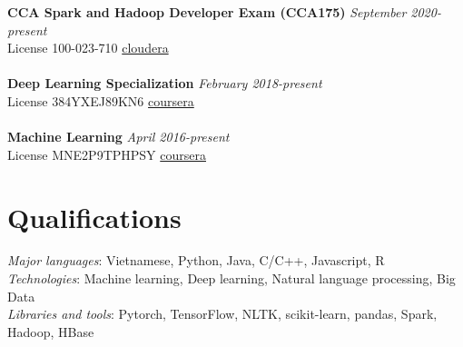 \documentclass[11pt,a4paper,roman]{article}
\begin{document}
\textbf{CCA Spark and Hadoop Developer Exam (CCA175)}
\hfill
\textit{September 2020-present} \\
License 100-023-710
\hfill
\href{http://certification.cloudera.com/verify/user}{cloudera}
\\\\
\textbf{Deep Learning Specialization}
\hfill
\textit{February 2018-present} \\
License 384YXEJ89KN6
\hfill
\href{https://www.coursera.org/account/accomplishments/verify/384YXEJ89KN6}{coursera}
\\\\
\textbf{Machine Learning}
\hfill
\textit{April 2016-present} \\
License MNE2P9TPHPSY
\hfill
\href{https://www.coursera.org/account/accomplishments/verify/MNE2P9TPHPSY}{coursera} 

\section{Qualifications}

\textit{Major languages}: Vietnamese, Python, Java, C/C++, Javascript, R
\\
\textit{Technologies}: Machine learning, Deep learning, Natural language processing, Big Data
\\
\textit{Libraries and tools}: Pytorch, TensorFlow, NLTK, scikit-learn, pandas, Spark, Hadoop, HBase
\end{document}
